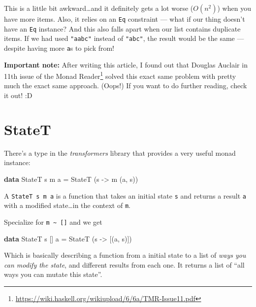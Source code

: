 \documentclass[]{article}
\newenvironment{Shaded}{}{}
\newcommand{\KeywordTok}[1]{\textcolor[rgb]{0.00,0.44,0.13}{\textbf{{#1}}}}
\newcommand{\DataTypeTok}[1]{\textcolor[rgb]{0.56,0.13,0.00}{{#1}}}
\newcommand{\OtherTok}[1]{\textcolor[rgb]{0.00,0.44,0.13}{{#1}}}
\newcommand{\FunctionTok}[1]{\textcolor[rgb]{0.02,0.16,0.49}{{#1}}}
\newcommand{\NormalTok}[1]{{#1}}
\renewcommand{\href}[2]{#2\footnote{\url{#1}}}
\begin{document}
This is a little bit awkward\ldots{}and it definitely gets a lot worse
(\(O(n^2)\)) when you have more items. Also, it relies on an \texttt{Eq}
constraint --- what if our thing doesn't have an \texttt{Eq} instance?
And this also falls apart when our list contains duplicate items. If we
had used \texttt{"aabc"} instead of \texttt{"abc"}, the result would be
the same --- despite having more
\texttt{\textquotesingle{}a\textquotesingle{}}s to pick from!

\textbf{Important note:} After writing this article, I found out that
Douglas Auclair in
\href{https://wiki.haskell.org/wikiupload/6/6a/TMR-Issue11.pdf}{11th
issue of the Monad Reader} solved this exact same problem with pretty
much the exact same approach. (Oops!) If you want to do further reading,
check it out! :D

\section{StateT}\label{statet}

There's a type in the \emph{transformers} library that provides a very
useful monad instance:

\begin{Shaded}
\begin{Highlighting}[]
\KeywordTok{data} \DataTypeTok{StateT} \NormalTok{s m a }\FunctionTok{=} \DataTypeTok{StateT} \NormalTok{(s }\OtherTok{->} \NormalTok{m (a, s))}
\end{Highlighting}
\end{Shaded}

A \texttt{StateT\ s\ m\ a} is a function that takes an initial state
\texttt{s} and returns a result \texttt{a} with a modified
state\ldots{}in the context of \texttt{m}.

Specialize for \texttt{m\ \textasciitilde{}\ {[}{]}} and we get

\begin{Shaded}
\begin{Highlighting}[]
\KeywordTok{data} \DataTypeTok{StateT} \NormalTok{s [] a }\FunctionTok{=} \DataTypeTok{StateT} \NormalTok{(s }\OtherTok{->} \NormalTok{[(a, s)])}
\end{Highlighting}
\end{Shaded}

Which is basically describing a function from a initial state to a list
of \emph{ways you can modify the state}, and different results from each
one. It returns a list of ``all ways you can mutate this state''.
\end{document}
